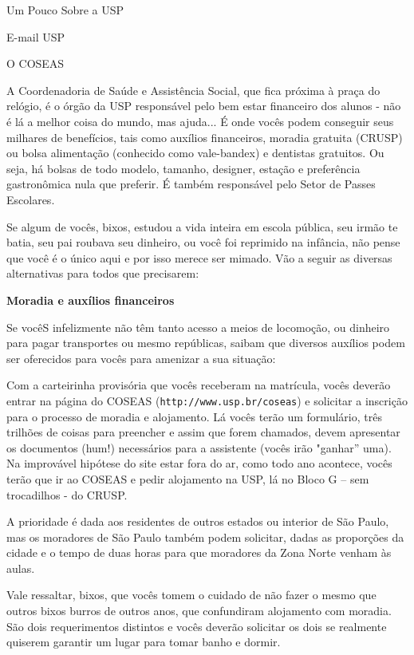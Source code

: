 \begin{secao}{Um Pouco Sobre a USP}
\begin{subsecao}{E-mail USP}
\end{subsecao}

\begin{subsecao}{O COSEAS}

A Coordenadoria de Saúde e Assistência Social, que fica próxima à praça do relógio,
é o órgão da USP responsável pelo bem estar financeiro dos alunos - não é lá a
melhor coisa do mundo, mas ajuda... É onde vocês podem conseguir seus milhares de
benefícios, tais como auxílios financeiros, moradia gratuita (CRUSP) ou bolsa
alimentação (conhecido como vale-bandex) e dentistas gratuitos. Ou seja, há
bolsas de todo modelo, tamanho, designer, estação e preferência gastronômica
nula que preferir. É também responsável pelo Setor de Passes Escolares. 

Se algum de vocês, bixos, estudou a vida inteira em escola pública, seu irmão te batia,
seu pai roubava seu dinheiro, ou você foi reprimido na infância, não pense que
você é o único aqui e por isso merece ser mimado. Vão a seguir as diversas
alternativas para todos que precisarem:

{\bf Moradia e auxílios financeiros}

Se vocêS infelizmente não têm tanto acesso a meios de locomoção, ou dinheiro para
pagar transportes ou mesmo repúblicas, saibam que diversos auxílios podem ser
oferecidos para vocês para amenizar a sua situação:

Com a carteirinha provisória que vocês receberam na matrícula, vocês deverão entrar
na página do COSEAS ({\tt http://www.usp.br/coseas}) e solicitar a inscrição
para o processo de moradia e alojamento. Lá vocês terão um formulário, três
trilhões de coisas para preencher e assim que forem chamados, devem apresentar os
documentos (hum!) necessários para a assistente (vocês irão "ganhar” uma). Na
improvável hipótese do site estar fora do ar, como todo ano acontece, vocês terão
que ir ao COSEAS e pedir alojamento na USP, lá no Bloco G – sem trocadilhos - do
CRUSP.

A prioridade é dada aos residentes de outros estados ou interior de São Paulo,
mas os moradores de São Paulo também podem solicitar, dadas as proporções da
cidade e o tempo de duas horas para que moradores da Zona Norte venham às aulas. 

Vale ressaltar, bixos, que vocês tomem o cuidado de não fazer o mesmo que outros
bixos burros de outros anos, que confundiram alojamento com moradia. São dois
requerimentos distintos e vocês deverão solicitar os dois se realmente quiserem
garantir um lugar para tomar banho e dormir.


\end{subsecao}
\end{secao}
